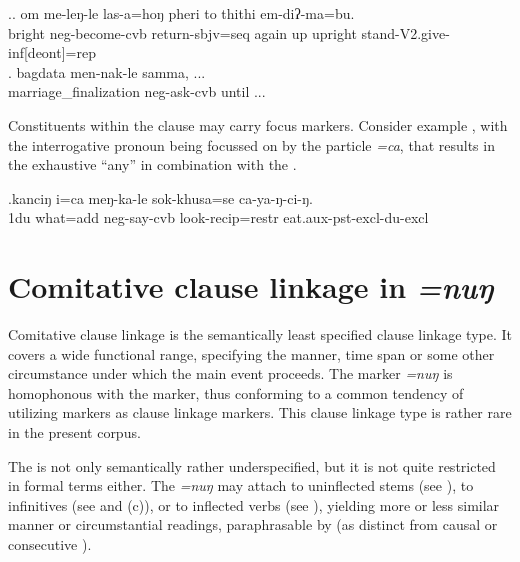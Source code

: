 \ex.\ag. om   me-leŋ-le  las-a=hoŋ  pheri to  thithi    em-diʔ-ma=bu.\\
bright {\sc neg}-become-{\sc cvb} return{\sc [3sg]-sbjv=seq} again up upright stand{\sc -V2.give-inf[deont]=rep}\\
 
\bg. bagdata  men-nak-le    samma, ...\\
marriage\_finalization {\sc neg}-ask-{\sc cvb}  until ...\\
 


Constituents within the clause may carry focus markers. Consider example \Next, with the interrogative pronoun being focussed on by the  particle \emph{=ca}, that results in the exhaustive  “any” in combination with the . 

\exg.kanciŋ i=ca meŋ-ka-le sok-khusa=se ca-ya-ŋ-ci-ŋ.\\
{\sc 1du} what{\sc =add} {\sc neg}-say-{\sc cvb} look{\sc -recip=restr} eat.{\sc aux-pst-excl-du-excl}\\
 


\section{Comitative clause linkage in \emph{=nuŋ}}\label{com-cl}

Comitative clause linkage is the semantically least specified  clause linkage type. It covers a wide functional range, specifying the  manner, time span  or some other circumstance under which the main event proceeds. The marker \emph{=nuŋ} is homophonous with the   marker, thus conforming to a common  tendency of utilizing  markers as clause linkage markers. This clause linkage type is rather rare in the present corpus.

The  is not only semantically rather underspecified, but it is not quite restricted in formal terms either. The  \emph{=nuŋ} may attach to uninflected stems (see \Next[a]), to infinitives (see \Next[b] and (c)), or to inflected verbs (see \Next[d]), yielding more or less similar manner or circumstantial readings, paraphrasable by  (as distinct from causal or consecutive ). 

